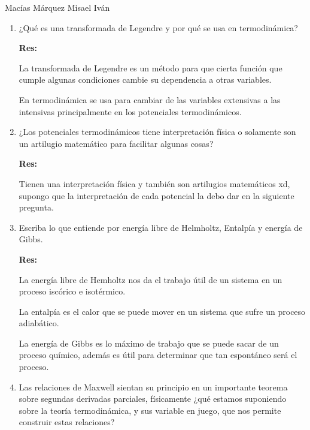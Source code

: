 \documentclass[12pt,a4paper]{article}
\begin{document}
Macías Márquez Misael Iván

\begin{enumerate}






\item ¿Qué es una transformada de Legendre y por qué se usa en termodinámica?

\textbf{Res:}

La transformada de Legendre es un método para que cierta función que cumple algunas condiciones cambie su dependencia a otras variables.

En termodinámica se usa para cambiar de las variables extensivas a las intensivas principalmente en los potenciales termodinámicos.






\item ¿Los potenciales termodinámicos tiene interpretación física o solamente son un artilugio matemático para facilitar algunas cosas?

\textbf{Res:}

Tienen una interpretación física y también son artilugios matemáticos xd, supongo que la interpretación de cada potencial la debo dar en la siguiente pregunta.






\item Escriba lo que entiende por energía libre de Helmholtz, Entalpía y energía de Gibbs.

\textbf{Res:}

La energía libre de Hemholtz nos da el trabajo útil de un sistema en un proceso iscórico e isotérmico.

La entalpía es el calor que se puede mover en un sistema que sufre un proceso adiabático.

La energía de Gibbs es lo máximo de trabajo que se puede sacar de un proceso químico, además es útil para determinar que tan espontáneo será el proceso.






\item Las relaciones de Maxwell sientan su principio en un importante teorema sobre segundas derivadas parciales, físicamente ¿qué estamos suponiendo sobre la teoría termodinámica, y sus variable en juego, que nos permite construir estas relaciones?


\end{enumerate}
\end{document}
